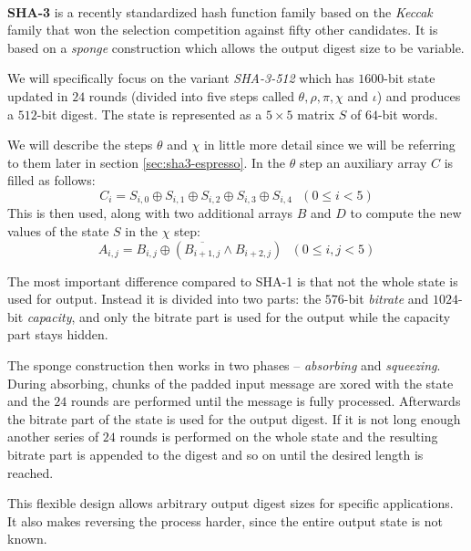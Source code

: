 ~\\

\textbf{SHA-3} is a recently standardized \cite{NIST2015FIPS202} hash function family based on the \emph{Keccak} family \cite{bertoni2011keccak} that won the selection competition against fifty other candidates.
It is based on a \emph{sponge} construction which allows the output digest size to be variable.

We will specifically focus on the variant \emph{SHA-3-512} which has $1600$-bit state updated in $24$ rounds (divided into five steps called $\theta, \rho, \pi, \chi$ and $\iota$) and produces a $512$-bit digest.
The state is represented as a $5\times 5$ matrix $S$ of $64$-bit words.

We will describe the steps $\theta$ and $\chi$ in little more detail since we will be referring to them later in section \ref{sec:sha3-espresso}.
In the $\theta$ step an auxiliary array $C$ is filled as follows:
\[
C_i = S_{i,0} \oplus S_{i,1} \oplus S_{i,2} \oplus S_{i,3} \oplus S_{i,4} ~~~ (0 \le i < 5)
\]
This is then used, along with two additional arrays $B$ and $D$ to compute the new values of the state $S$ in the $\chi$ step:
\[
A_{i,j} = B_{i,j} \oplus (\overline{B_{i+1,j}} \land B_{i+2,j}) ~~~ (0 \le i,j < 5)
\]

The most important difference compared to SHA-1 is that not the whole state is used for output.
Instead it is divided into two parts: the $576$-bit \emph{bitrate} and $1024$-bit \emph{capacity}, and only the bitrate part is used for the output while the capacity part stays hidden.

The sponge construction then works in two phases -- \emph{absorbing} and \emph{squeezing}.
During absorbing, chunks of the padded input message are xored with the state and the $24$ rounds are performed until the message is fully processed.
Afterwards the bitrate part of the state is used for the output digest.
If it is not long enough another series of $24$ rounds is performed on the whole state and the resulting bitrate part is appended to the digest and so on until the desired length is reached.

This flexible design allows arbitrary output digest sizes for specific applications.
It also makes reversing the process harder, since the entire output state is not known.

